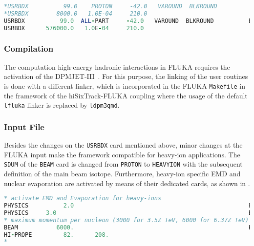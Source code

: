 \vspace{0.5cm}
\begin{minipage}{\linewidth}
\begin{lstlisting}[language=Fortran,caption=USRBDX card in the FLUKA input for the nominal SixTrack-FLUKA coupling (commented out) and the heavy-ion version on bottom.,label=lst:usrbdx]
*USRBDX          99.0    PROTON     -42.0   VAROUND  BLKROUND          BACK2ICO
*USRBDX        8000.0   1.0E-04     210.0                              &
USRBDX          99.0  ALL-PART     -42.0   VAROUND  BLKROUND          BACK2ICO
USRBDX      576000.0   1.0E-04     210.0                   
\end{lstlisting}
\end{minipage}


\subsubsection{Compilation}

The computation high-energy hadronic interactions in FLUKA requires the activation of the DPMJET-III~\cite{fluka-course}. For this purpose, the linking of the user routines is done with a different linker, which is incorporated in the FLUKA \texttt{Makefile} in the framework of the hiSixTrack-FLUKA coupling where the usage of the default \texttt{lfluka} linker is replaced by \texttt{ldpm3qmd}.



\subsubsection{Input File}

Besides the changes on the \texttt{USRBDX} card mentioned above, minor changes at the FLUKA input make the framework compatible for heavy-ion applications. The \texttt{SDUM} of the \texttt{BEAM} card is changed from \texttt{PROTON} to \texttt{HEAVYION} with the subsequent definition of the main beam isotope. Furthermore, heavy-ion specific EMD and nuclear evaporation are activated by means of their dedicated cards, as shown in .

\vspace{0.5cm}
\begin{minipage}{\linewidth}
\begin{lstlisting}[language=Fortran,caption=Changes in the FLUKA input for heavy-ion applications,label=lst:input]
* activate EMD and Evaporation for heavy-ions 
PHYSICS          2.0                                                  EM-DISSO 
PHYSICS     3.0                                                       EVAPORAT
* maximum momentum per nucleon (3000 for 3.5Z TeV, 6000 for 6.37Z TeV)
BEAM           6000.                                                  HEAVYION
HI-PROPE         82.      208.                                                
*
\end{lstlisting}
\end{minipage}


